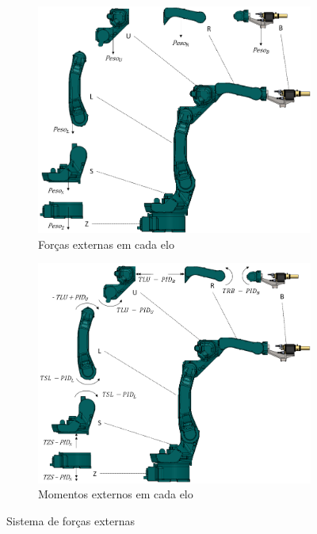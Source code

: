 \begin{figure}[h]
    \centering
    \begin{subfigure}[b]{0.6\textwidth}
        \includegraphics[width=\textwidth]{figs/forcas_ext}
        \caption{Forças externas em cada elo}
        \label{fig::fex}
    \end{subfigure}
    \quad %
    \begin{subfigure}[b]{0.6\textwidth}
        \includegraphics[width=\textwidth]{figs/mom_ext}
        \caption{Momentos externos em cada elo}
        \label{fig::mex}
    \end{subfigure}
    \caption{Sistema de forças externas}\label{fig::sisfex}
\end{figure}
%

